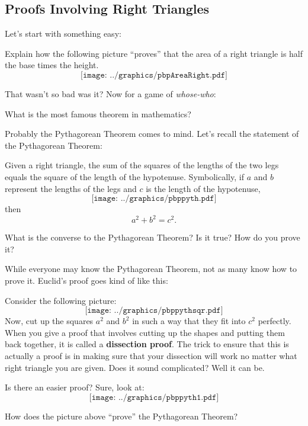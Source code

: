 \subsection{Proofs Involving Right Triangles}

Let's start with something easy:

\begin{question} Explain how the following picture ``proves'' that
  the area of a right triangle is half the base times the height.
\[
\texttt{[image: ../graphics/pbpAreaRight.pdf]}
\]
\end{question}
\QM 

That wasn't so bad was it? Now for a game of \textit{whose-who}:

\begin{question} What is the most famous theorem in mathematics? 
\end{question}
Probably the Pythagorean Theorem comes to mind. Let's recall the statement of the Pythagorean Theorem:

\begin{theorem} Given a right triangle, the sum of the squares of the 
lengths of the two legs equals the square of the length of 
the hypotenuse.  Symbolically, if $a$ and $b$ represent the 
lengths of the legs and $c$ is the length of the hypotenuse, 
\[
\texttt{[image: ../graphics/pbppyth.pdf]}
\]
then 
\[
a^2 + b^2 = c^2.
\]
\end{theorem}
\begin{question} What is the converse to the Pythagorean Theorem? Is it true? How do you prove it?
\end{question}
\QM

While everyone may know the Pythagorean Theorem, not as many know how to prove it. Euclid's proof goes kind of like this: 

Consider the following picture:
\[
\texttt{[image: ../graphics/pbppythsqr.pdf]}
\]
Now, cut up the squares $a^2$ and $b^2$ in such a way that they fit into $c^2$ perfectly. When you give a proof that involves cutting up the shapes and putting them back together, it is called a \textbf{dissection proof}. The trick to ensure that this is actually a proof is in making sure
that your dissection will work no matter what right triangle you are
given. Does it sound complicated? Well it can be. 


Is there an easier proof?  Sure, look at:
\[
\texttt{[image: ../graphics/pbppyth1.pdf]}
\]
\begin{question} How does the picture above ``prove'' the Pythagorean Theorem?
\end{question}


